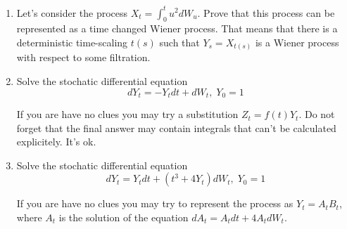 \documentclass[12pt]{article}
\begin{document}
\begin{enumerate}
\item Let's consider the process $X_t = \int_0^t u^2 dW_u$. 
Prove that this process can be represented as a time changed Wiener process. 
That means that there is a deterministic time-scaling $t(s)$ 
such that $Y_s = X_{t(s)}$ is a Wiener process with respect to some filtration. 

\item Solve the stochatic differential equation
\[
dY_t = - Y_t dt + dW_t, \; Y_0 = 1
\]

If you are have no clues you may try a substitution $Z_t = f(t) Y_t$. 
Do not forget that the final answer may contain integrals that can't be calculated explicitely. It's ok.

\item Solve the stochatic differential equation
\[
dY_t = Y_t dt + (t^3 + 4Y_t) dW_t, \; Y_0 = 1
\]

If you are have no clues you may try to represent the process as $Y_t = A_t B_t$, 
where $A_t$ is the solution of the equation $dA_t = A_t dt + 4A_t dW_t$. 


\end{enumerate}
\end{document}
